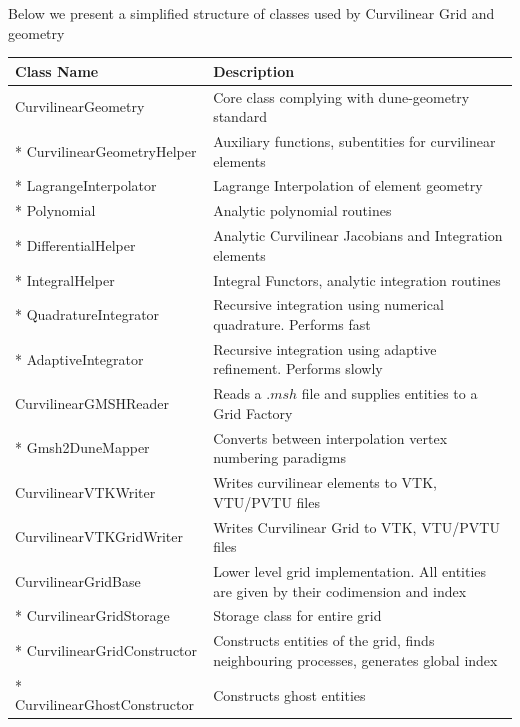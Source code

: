 Below we present a simplified structure of classes used by Curvilinear Grid and geometry \\

\noindent
\begin{tabularx}{\textwidth}{ l | X }
\hline
   Class Name & Description \\ \hline
   CurvilinearGeometry                & Core class complying with dune-geometry standard \\ \hline
   * CurvilinearGeometryHelper        & Auxiliary functions, subentities for curvilinear elements \\ \hline
   * LagrangeInterpolator             & Lagrange Interpolation of element geometry \\ \hline
   * Polynomial                       & Analytic polynomial routines \\ \hline
   * DifferentialHelper               & Analytic Curvilinear Jacobians and Integration elements \\ \hline
   * IntegralHelper                   & Integral Functors, analytic integration routines  \\ \hline
   * QuadratureIntegrator             & Recursive integration using numerical quadrature. Performs fast \\ \hline
   * AdaptiveIntegrator               & Recursive integration using adaptive refinement. Performs slowly \\ \hline
  CurvilinearGMSHReader               & Reads a $.msh$ file and supplies entities to a Grid Factory \\ \hline
  * Gmsh2DuneMapper                   & Converts between interpolation vertex numbering paradigms \\ \hline
  CurvilinearVTKWriter                & Writes curvilinear elements to VTK, VTU/PVTU files \\ \hline
  CurvilinearVTKGridWriter            & Writes Curvilinear Grid to VTK, VTU/PVTU files \\ \hline
  CurvilinearGridBase                 & Lower level grid implementation. All entities are given by their codimension and index \\ \hline
  * CurvilinearGridStorage            & Storage class for entire grid \\ \hline
  * CurvilinearGridConstructor        & Constructs entities of the grid, finds neighbouring processes, generates global index \\ \hline
  * CurvilinearGhostConstructor       & Constructs ghost entities \\ \hline

\end{tabularx}
